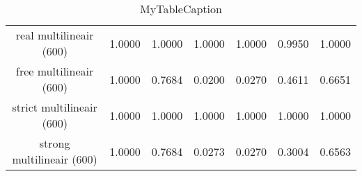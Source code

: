 \begin{table}
\centering
\begin{tabular}{|c|c|c|c|c|c|c|}
\hline
 &  &  &  &  &  &  \\
\hline
real multilineair (600) & 1.0000 & 1.0000 & 1.0000 & 1.0000 & 0.9950 & 1.0000 \\
\hline
free multilineair (600) & 1.0000 & 0.7684 & 0.0200 & 0.0270 & 0.4611 & 0.6651 \\
\hline
strict multilineair (600) & 1.0000 & 1.0000 & 1.0000 & 1.0000 & 1.0000 & 1.0000 \\
\hline
strong multilineair (600) & 1.0000 & 0.7684 & 0.0273 & 0.0270 & 0.3004 & 0.6563 \\
\hline
\end{tabular}
\caption{MyTableCaption}
\label{table:MyTableLabel}
\end{table}
